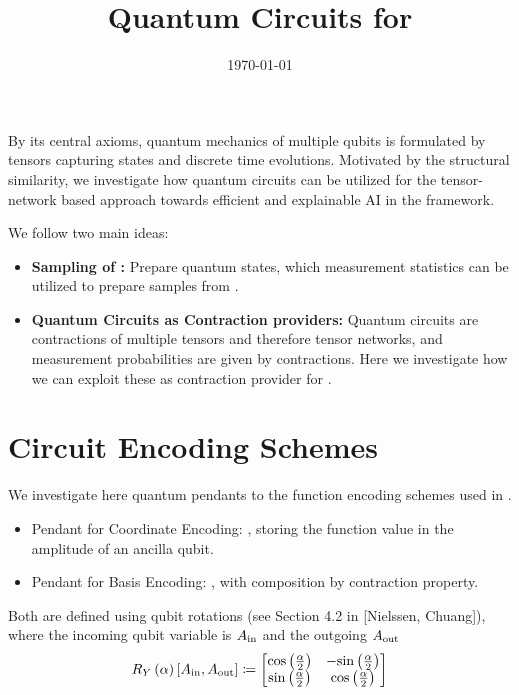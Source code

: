\documentclass[aps,onecolumn,nofootinbib,pra]{article}
\begin{document}
    \title{Quantum Circuits for \tnreason{}}

    \maketitle
    \date{\today}

    By its central axioms, quantum mechanics of multiple qubits is formulated by tensors capturing states and discrete time evolutions.
    Motivated by the structural similarity, we investigate how quantum circuits can be utilized for the tensor-network based approach towards efficient and explainable AI in the \tnreason{} framework.

    We follow two main ideas:
    \begin{itemize}
        \item \textbf{Sampling of \ComputationActivationNetworks{}:} Prepare quantum states, which measurement statistics can be utilized to prepare samples from \ComputationActivationNetworks{}.
        \item \textbf{Quantum Circuits as Contraction providers:} Quantum circuits are contractions of multiple tensors and therefore tensor networks, and measurement probabilities are given by contractions.
        Here we investigate how we can exploit these as contraction provider for \tnreason{}.
    \end{itemize}

    \tableofcontents


    \section{Circuit Encoding Schemes}

    We investigate here quantum pendants to the function encoding schemes used in \tnreason{}{}.

    \begin{itemize}
        \item Pendant for Coordinate Encoding: \textbf{\ActivationCircuit{}}, storing the function value in the amplitude of an ancilla qubit.
        \item Pendant for Basis Encoding: \textbf{\ComputationCircuit{}}, with composition by contraction property.
    \end{itemize}

    Both are defined using qubit rotations (see Section 4.2 in [Nielssen, Chuang]), where the incoming qubit variable is $A_{\mathrm{in}}$ and the outgoing $A_{\mathrm{out}}$
    \begin{align*}
        R_Y\left({\alpha}\right)\left[A_{\mathrm{in}},A_{\mathrm{out}}\right] \coloneqq
        \begin{bmatrix}
            \mathrm{cos}\left(\frac{\alpha}{2}\right) & -\mathrm{sin}\left(\frac{\alpha}{2}\right) \\
            \mathrm{sin}\left(\frac{\alpha}{2}\right) & \mathrm{cos}\left(\frac{\alpha}{2}\right)
        \end{bmatrix}
    \end{align*}
\end{document}

